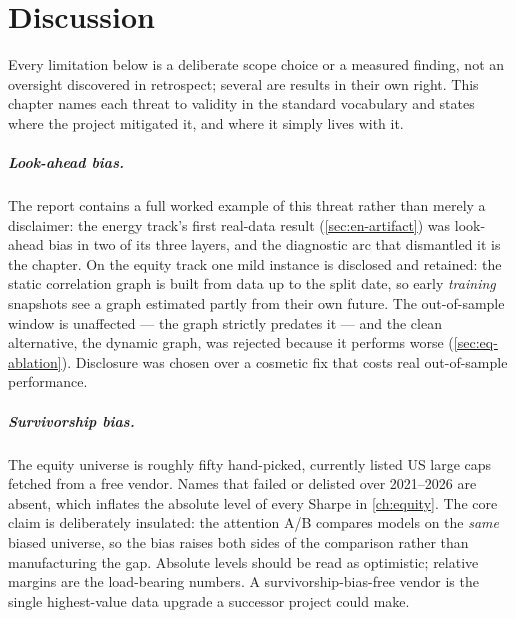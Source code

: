 \chapter{Discussion}
\label{ch:discussion}

Every limitation below is a deliberate scope choice or a measured
finding, not an oversight discovered in retrospect; several are results
in their own right. This chapter names each threat to validity in the
standard vocabulary and states where the project mitigated it, and where
it simply lives with it.

\paragraph{Look-ahead bias.} The report contains a full worked example
of this threat rather than merely a disclaimer: the energy track's first
real-data result (\cref{sec:en-artifact}) was look-ahead bias in two of
its three layers, and the diagnostic arc that dismantled it is the
chapter. On the equity track one mild instance is disclosed and
retained: the static correlation graph is built from data up to the
split date, so early \emph{training} snapshots see a graph estimated
partly from their own future. The out-of-sample window is unaffected ---
the graph strictly predates it --- and the clean alternative, the
dynamic graph, was rejected because it performs worse
(\cref{sec:eq-ablation}). Disclosure was chosen over a cosmetic fix that
costs real out-of-sample performance.

\paragraph{Survivorship bias.} The equity universe is roughly fifty
hand-picked, currently listed US large caps fetched from a free vendor.
Names that failed or delisted over 2021--2026 are absent, which inflates
the absolute level of every Sharpe in \cref{ch:equity}. The core claim
is deliberately insulated: the attention A/B compares models on the
\emph{same} biased universe, so the bias raises both sides of the
comparison rather than manufacturing the gap. Absolute levels should be
read as optimistic; relative margins are the load-bearing numbers. A
survivorship-bias-free vendor is the single highest-value data upgrade a
successor project could make.

